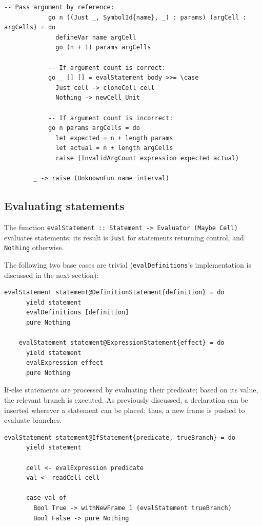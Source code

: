 \documentclass[UdineBachThesis,american,11pt]{PhdThesis}
\begin{document}
  \pagebreak

  \begin{Verbatim}[gobble=4,fontsize=\small]
            -- Pass argument by reference:
            go n ((Just _, SymbolId{name}, _) : params) (argCell : argCells) = do
              defineVar name argCell
              go (n + 1) params argCells

            -- If argument count is correct:
            go _ [] [] = evalStatement body >>= \case
              Just cell -> cloneCell cell
              Nothing -> newCell Unit

            -- If argument count is incorrect:
            go n params argCells = do
              let expected = n + length params
              let actual = n + length argCells
              raise (InvalidArgCount expression expected actual)

        _ -> raise (UnknownFun name interval)
  \end{Verbatim}

  \subsection{Evaluating statements}

  The function
  \mbox{\texttt{evalStatement :: Statement -> Evaluator (Maybe Cell)}} evaluates
  statements; its result is \mbox{\texttt{Just}} for statements returning
  control, and \mbox{\texttt{Nothing}} otherwise.

  The following two base cases are trivial (\mbox{\texttt{evalDefinitions}}'s
  implementation is discussed in the next section):

  \begin{Verbatim}[gobble=4,fontsize=\small]
    evalStatement statement@DefinitionStatement{definition} = do
      yield statement
      evalDefinitions [definition]
      pure Nothing

    evalStatement statement@ExpressionStatement{effect} = do
      yield statement
      evalExpression effect
      pure Nothing
  \end{Verbatim}

  If-else statements are processed by evaluating their predicate; based on its
  value, the relevant branch is executed. As previously discussed, a declaration
  can be inserted wherever a statement can be placed; thus, a new frame is
  pushed to evaluate branches.

  \begin{Verbatim}[gobble=4,fontsize=\small]
    evalStatement statement@IfStatement{predicate, trueBranch} = do
      yield statement

      cell <- evalExpression predicate
      val <- readCell cell

      case val of
        Bool True -> withNewFrame 1 (evalStatement trueBranch)
        Bool False -> pure Nothing
  \end{Verbatim}
\end{document}
